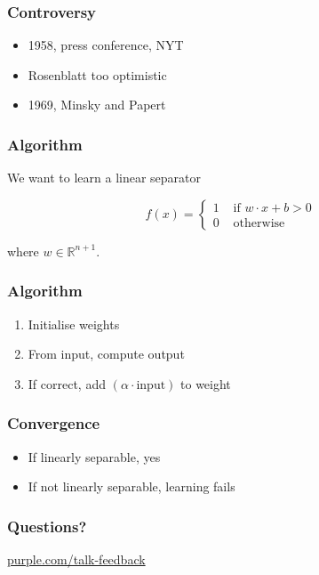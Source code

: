 \begin{frame}
  \frametitle{Controversy}
  \begin{itemize}
  \item 1958, press conference, NYT
  \item Rosenblatt too optimistic
  \item 1969, Minsky and Papert
  \end{itemize}
\end{frame}

\begin{frame}
  \frametitle{Algorithm}

  \hspace{27mm}We want to learn a linear separator
  
  \begin{displaymath}
    f(x) = \left\{
    \begin{array}{ll}
      1 & \text{ if } w\cdot x + b > 0 \\[2mm]
      0 & \text{ otherwise}
    \end{array}\right.
  \end{displaymath}
  
  \hspace{27mm}where $w\in \mathbb{R}^{n+1}$.
\end{frame}

\begin{frame}
  \frametitle{Algorithm}
  \begin{enumerate}
  \item Initialise weights
  \item From input, compute output
  \item If correct, add $(\alpha \cdot\text{input})$ to weight
  \end{enumerate}
\end{frame}

\begin{frame}
  \frametitle{Convergence}
  \begin{itemize}
  \item If linearly separable, yes
  \item If not linearly separable, learning fails
  \end{itemize}
\end{frame}

\begin{frame}
\end{frame}


\begin{frame}
  \frametitle{Questions?}
  \centerline{\large\url{purple.com/talk-feedback}}
\end{frame}


